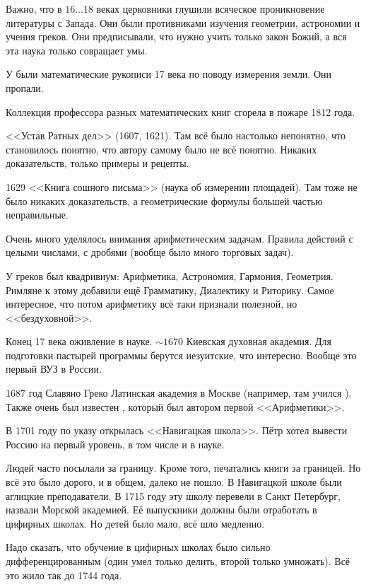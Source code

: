 \documentclass[a4paper,oneside,fleqn,10pt]{article}
\newcommand{\pe}[2]{${#1}\ldots{#2}$}
\begin{document}
Важно, что в \pe{16}{18} веках церковники глушили всяческое проникновение литературы с Запада.
Они были противниками изучения геометрии, астрономии и учения греков. Они предписывали,
что нужно учить только закон Божий, а вся эта наука только совращает умы.

У  были математические рукописи 17 века по поводу измерения земли.
Они пропали.

Коллекция профессора  разных математических книг сгорела в пожаре 1812 года.

<<Устав Ратных дел>> (1607, 1621). Там всё было настолько непонятно, что становилось
понятно, что автору самому было не всё понятно. Никаких доказательств,
только примеры и рецепты.

1629 <<Книга сошного письма>> (наука об измерении площадей).
Там тоже не было никаких доказательств, а геометрические формулы большей частью неправильные.

Очень много уделялось внимания арифметическим задачам.
Правила действий с целыми числами, с дробями (вообще было много торговых
задач).

У греков был квадривиум: Арифметика, Астрономия, Гармония, Геометрия.
Римляне к этому добавили ещё  Грамматику, Диалектику и Риторику.
Самое интересное, что потом арифметику всё таки признали полезной, но <<бездуховной>>.

Конец 17 века оживление в науке. $\sim1670$ Киевская духовная академия.
Для подготовки пастырей программы берутся иезуитские, что интересно.
Вообще это первый ВУЗ в России.

1687 год Славяно Греко Латинская академия в Москве (например, там учился
). Также очень был известен , который был автором первой <<Арифметики>>.

В 1701 году по указу  открылась <<Навигацкая школа>>.
Пётр хотел вывести Россию на первый уровень, в том числе и в науке.

Людей часто посылали за границу. Кроме того, печатались книги за границей.
Но всё это было дорого, и в общем, далеко не пошло.
В Навигацкой школе были аглицкие преподаватели.  В 1715 году эту школу перевели
в Санкт Петербург, назвали Морской академией.
Её выпускники должны были отработать в цифирных школах.
Но детей было мало, всё шло медленно.

Надо сказать, что обучение в цифирных школах было сильно
дифференцированным (один умел только делить, второй только умножать).
Всё это жило так до 1744 года.
\end{document}
